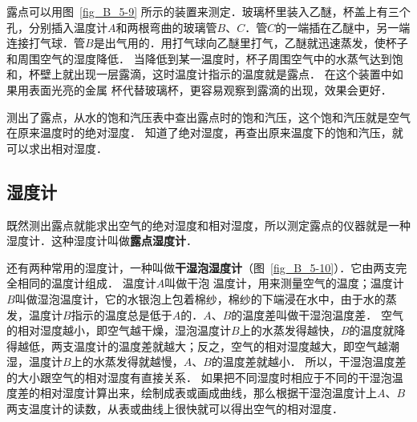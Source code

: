 露点可以用图~\ref{fig_B_5-9} 所示的装置来测定．玻璃杯里装入乙醚，杯盖上有三个孔，分别插入温度计$A$和两根弯曲的玻璃管$B$、$C$．管$C$的一端插在乙醚中，另一端连接打气球．管$B$是出气用的．用打气球向乙醚里打气，乙醚就迅速蒸发，使杯子和周围空气的湿度降低．
当降低到某一温度时，杯子周围空气中的水蒸气达到饱和，杯壁上就出现一层露滴，这时温度计指示的温度就是露点．
在这个装置中如果用表面光亮的金属
杯代替玻璃杯，更容易观察到露滴的出现，效果会更好．

测出了露点，从水的饱和汽压表中查出露点时的饱和汽压，这个饱和汽压就是空气在原来温度时的绝对湿度．
知道了绝对湿度，再查出原来温度下的饱和汽压，就可以求出相对湿度．

\subsection{湿度计} 
既然测出露点就能求出空气的绝对湿度和相对湿度，所以测定露点的仪器就是一种湿度计．这种湿度计叫做\textbf{露点湿度计}．


还有两种常用的湿度计，一种叫做\textbf{干湿泡湿度计}（图~\ref{fig_B_5-10}）．它由两支完全相同的温度计组成．
温度计$A$叫做干泡
温度计，用来测量空气的温度；温度计$B$叫做湿泡温度计，它的水银泡上包着棉纱，棉纱的下端浸在水中，由于水的蒸发，温度计$B$指示的温度总是低于$A$的．$A$、$B$的温度差叫做干湿泡温度差．
空气的相对湿度越小，即空气越干燥，湿泡温度计$B$上的水蒸发得越快，$B$的温度就降得越低，两支温度计的温度差就越大；反之，空气的相对湿度越大，即空气越潮湿，温度计$B$上的水蒸发得就越慢，$A$、$B$的温度差就越小．
所以，干湿泡温度差的大小跟空气的相对湿度有直接关系．
如果把不同湿度时相应于不同的干湿泡温度差的相对湿度计算出来，绘制成表或画成曲线，那么根据干湿泡温度计上$A$、$B$两支温度计的读数，从表或曲线上很快就可以得出空气的相对湿度．



